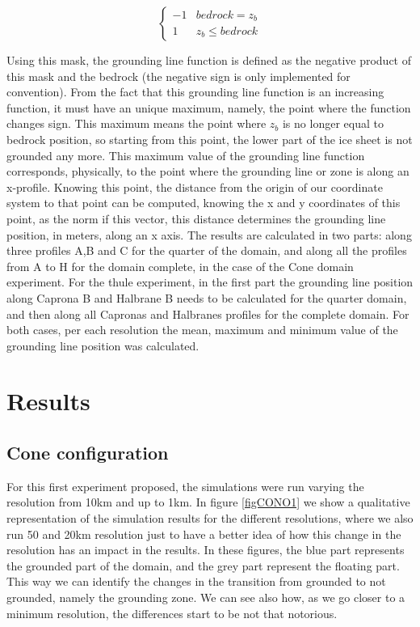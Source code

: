 \documentclass{article}
\begin{document}
\[ \begin{cases} 
	-1 & bedrock = z_b \\
	1 & z_b \leq bedrock   
\end{cases}
\]

Using this mask, the grounding line function is defined as the negative product of this mask and the bedrock (the negative sign is only implemented for convention). From the fact that this grounding line function is an increasing function, it must have an unique maximum, namely, the point where the function changes sign. This maximum means the point where $z_b$ is no longer equal to bedrock position, so starting from this point, the lower part of the ice sheet is not grounded any more. This maximum value of the grounding line function corresponds, physically, to the point where the grounding line or zone is along an x-profile. Knowing this point, the distance from the origin of our coordinate system to that point can be computed, knowing the x and y coordinates of this point, as the norm if this vector, this distance determines the grounding line position, in meters, along an x axis. The results are calculated in two parts: along three profiles A,B and C for the quarter of the domain, and along all the profiles from A to H for the domain complete, in the case of the Cone domain experiment. For the thule experiment, in the first part the grounding line position along Caprona B and Halbrane B needs to be calculated for the quarter domain, and then along all Capronas and Halbranes profiles for the complete domain. For both cases, per each resolution the mean, maximum and minimum value of the grounding line position was calculated.

\section{Results}
\subsection{Cone configuration}

For this first experiment proposed, the simulations were run varying the resolution from 10km and up to 1km. In figure \ref{figCONO1} we show a qualitative representation of the simulation results for the different resolutions, where we also run 50 and 20km resolution just to have a better idea of how this change in the resolution has an impact in the results. In these figures, the blue part represents the grounded part of the domain, and the grey part represent the floating part. This way we can identify the changes in the transition from grounded to not grounded, namely the grounding zone. We can see also how, as we go closer to a minimum resolution, the differences start to be not that notorious. 
\end{document}
